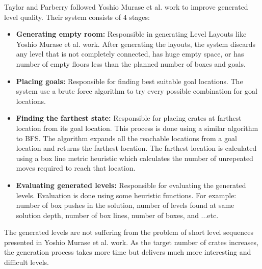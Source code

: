 Taylor and Parberry\cite{sokobanLevelGenerationNew} followed Yoshio Murase et al.\cite{sokobanLevelGenerationOld} work to improve generated level quality. Their system consists of 4 stages:
\begin{itemize} \itemsep0pt \parskip0pt 
	\item \textbf{Generating empty room:} Responsible in generating Level Layouts like Yoshio Murase et al.\cite{sokobanLevelGenerationOld} work. After generating the layouts, the system discards any level that is not completely connected, has huge empty space, or has number of empty floors less than the planned number of boxes and goals.
	\item \textbf{Placing goals:} Responsible for finding best suitable goal locations. The system use a brute force algorithm to try every possible combination for goal locations.
	\item \textbf{Finding the farthest state:} Responsible for placing crates at farthest location from its goal location. This process is done using a similar algorithm to BFS. The algorithm expands all the reachable locations from a goal location and returns the farthest location. The farthest location is calculated using a box line metric heuristic which calculates the number of unrepeated moves required to reach that location.
	\item \textbf{Evaluating generated levels:} Responsible for evaluating the generated levels. Evaluation is done using some heuristic functions. For example: number of box pushes in the solution, number of levels found at same solution depth, number of box lines, number of boxes, and ...etc.  
\end{itemize}
The generated levels are not suffering from the problem of short level sequences presented in Yoshio Murase et al.\cite{sokobanLevelGenerationOld} work. As the target number of crates increases, the generation process takes more time but delivers much more interesting and difficult levels.


